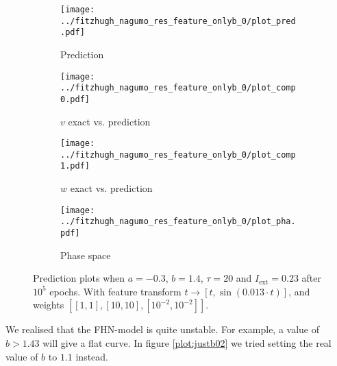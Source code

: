 \documentclass[a4paper]{article}
\begin{document}
\begin{figure}[H]
	\centering 
	\begin{subfigure}[b]{0.47\textwidth}
		\centering
		\texttt{[image: ../fitzhugh\_nagumo\_res\_feature\_onlyb\_0/plot\_pred.pdf]}
		\caption{Prediction}
		\label{fig:justb01a}
	\end{subfigure}
	\begin{subfigure}[b]{0.47\textwidth}
		\centering
		\texttt{[image: ../fitzhugh\_nagumo\_res\_feature\_onlyb\_0/plot\_comp0.pdf]}
		\caption{$v$ exact vs. prediction}
		\label{fig:justb01b}
	\end{subfigure}
	\begin{subfigure}[b]{0.47\textwidth}
		\centering
		\texttt{[image: ../fitzhugh\_nagumo\_res\_feature\_onlyb\_0/plot\_comp1.pdf]}
		\caption{$w$ exact vs. prediction}
		\label{fig:justb01c}
	\end{subfigure}
	\begin{subfigure}[b]{0.47\textwidth}
		\centering
		\texttt{[image: ../fitzhugh\_nagumo\_res\_feature\_onlyb\_0/plot\_pha.pdf]}
		\caption{Phase space}
		\label{fig:justb01d}
	\end{subfigure}
	\caption{Prediction plots when $a=-0.3$, $b=1.4$, $\tau=20$ and $ I_{\text{ext}}=0.23$ after $10^5$ epochs. With feature transform $t \rightarrow \left[ t, \sin(0.013\cdot t) \right] $, and weights $\left[ \left[ 1, 1\right], \left[ 10, 10\right], \left[ 10^{-2}, 10^{-2}\right]\right]$.}
	\label{plot:justb01}
\end{figure} 	

We realised that the FHN-model is quite unstable. For example, a value of $b>1.43$ will give a flat curve. 
In figure \ref{plot:justb02} we tried setting the real value of $b$ to $1.1$ instead. %
\end{document}
